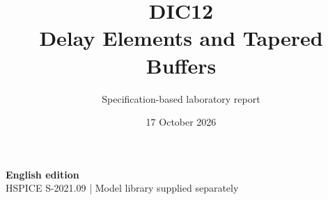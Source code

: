 \documentclass[11pt,a4paper]{article}
\title{\color{accent}DIC12\\[4pt]Delay Elements and Tapered Buffers}
\author{Specification-based laboratory report}
\date{17 October 2026}
\begin{document}
\maketitle
\begin{center}\small\textbf{English edition}\\
HSPICE S-2021.09 \quad | \quad Model library supplied separately
\end{center}


\end{document}
